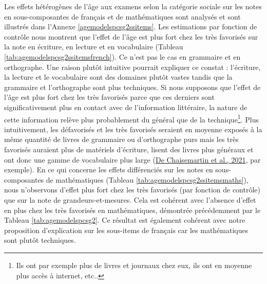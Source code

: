 \documentclass[
]{book}
\begin{document}
\quad Les effets hétérogènes de l'âge aux examens selon la catégorie sociale sur les notes en sous-composantes de français et de mathématiques sont analysés et sont illustrés dans l'Annexe \ref{agemodelspcsg2ssitems}. Les estimations par fonction de contrôle nous montrent que l'effet de l'âge est plus fort chez les très favorisés sur la note en écriture, en lecture et en vocabulaire (Tableau \ref{tab:agemodelspcsg2ssitemsfrench}). Ce n'est pas le cas en grammaire et en orthographe. Une raison plutôt intuitive pourrait expliquer ce constat : l'écriture, la lecture et le vocabulaire sont des domaines plutôt vastes tandis que la grammaire et l'orthographe sont plus techniques. Si nous supposons que l'effet de l'âge est plus fort chez les très favorisés parce que ces derniers sont significativement plus en contact avec de l'information littéraire, la nature de cette information relève plus probablement du général que de la technique\footnote{Ils ont par exemple plus de livres et journaux chez eux, ils ont en moyenne plus accès à internet, etc..}. Plus intuitivement, les défavorisés et les très favorisés seraient en moyenne exposés à la même quantité de livres de grammaire ou d'orthographe purs mais les très favorisés auraient plus de matériels d'écriture, lisent des livres plus généraux et ont donc une gamme de vocabulaire plus large (\protect\hyperlink{ref-CHA:eal:21}{De Chaisemartin et al., 2021}, par exemple).
En ce qui concerne les effets différenciés sur les notes en sous-composantes de mathématiques (Tableau \ref{tab:agemodelspcsg2ssitemsmaths}), nous n'observons d'effet plus fort chez les très favorisés (par fonction de contrôle) que sur la note de grandeurs-et-mesures. Cela est cohérent avec l'absence d'effet en plus chez les très favorisés en mathématiques, démontrée précédemment par le Tableau \ref{tab:agemodelspcsg2}. Ce résultat est également cohérent avec notre proposition d'explication sur les sous-items de français car les mathématiques sont plutôt techniques.

\begingroup\fontsize{8}{10}\selectfont
\end{document}
